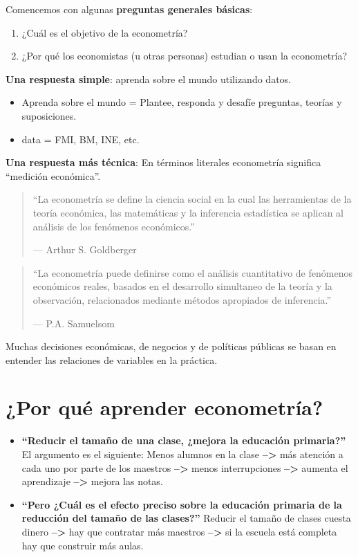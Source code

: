 \documentclass[
]{book}
\begin{document}
Comencemos con algunas \textbf{preguntas generales básicas}:

\begin{enumerate}
\def\labelenumi{\arabic{enumi}.}
\item
  ¿Cuál es el objetivo de la econometría?
\item
  ¿Por qué los economistas (u otras personas) estudian o usan la econometría?
\end{enumerate}

\textbf{Una respuesta simple}: aprenda sobre el mundo utilizando datos.

\begin{itemize}
\item
  Aprenda sobre el mundo = Plantee, responda y desafíe preguntas, teorías y suposiciones.
\item
  data = FMI, BM, INE, etc.
\end{itemize}

\textbf{Una respuesta más técnica}: En términos literales econometría significa ``medición económica''.

\begin{quote}
``La econometría se define la ciencia social en la cual las herramientas de la teoría económica, las matemáticas y la inferencia estadística se aplican al análisis de los fenómenos económicos.''

--- Arthur S. Goldberger
\end{quote}

\begin{quote}
``La econometría puede definirse como el análisis cuantitativo de fenómenos económicos reales, basados en el desarrollo simultaneo de la teoría y la observación, relacionados mediante métodos apropiados de inferencia.''

--- P.A. Samuelsom
\end{quote}

Muchas decisiones económicas, de negocios y de políticas públicas se basan en entender las relaciones de variables en la práctica.

\hypertarget{por-quuxe9-aprender-econometruxeda}{%
\section{¿Por qué aprender econometría?}\label{por-quuxe9-aprender-econometruxeda}}

\begin{itemize}
\item
  \textbf{``Reducir el tamaño de una clase, ¿mejora la educación primaria?''} El argumento es el siguiente: Menos alumnos en la clase \textbf{--\textgreater{}} más atención a cada uno por parte de los maestros \textbf{--\textgreater{}} menos interrupciones \textbf{--\textgreater{}} aumenta el aprendizaje \textbf{--\textgreater{}} mejora las notas.
\item
  \textbf{``Pero ¿Cuál es el efecto preciso sobre la educación primaria de la reducción del tamaño de las clases?''} Reducir el tamaño de clases cuesta dinero \textbf{--\textgreater{}} hay que contratar más maestros \textbf{--\textgreater{}} si la escuela está completa hay que construir más aulas.
\end{itemize}
\end{document}
